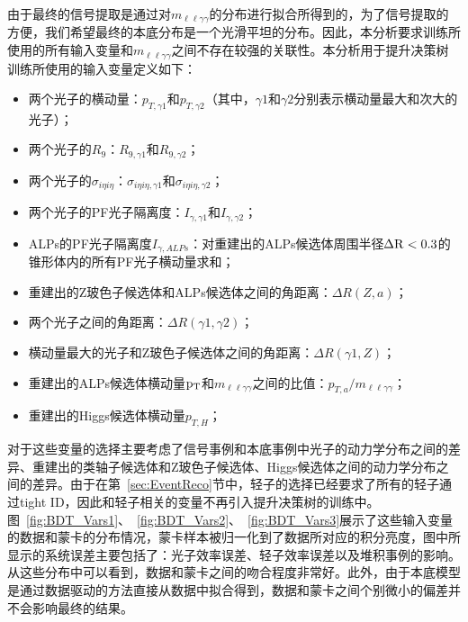 由于最终的信号提取是通过对$m_{\ell\ell\gamma\gamma}$的分布进行拟合所得到的，为了信号提取的方便，我们希望最终的本底分布是一个光滑平坦的分布。因此，本分析要求训练所使用的所有输入变量和$m_{\ell\ell\gamma\gamma}$之间不存在较强的关联性。本分析用于提升决策树训练所使用的输入变量定义如下：
\begin{itemize}
    \item 两个光子的横动量：$p_{T,\gamma1}$和$p_{T,\gamma2}$（其中，$\gamma1$和$\gamma2$分别表示横动量最大和次大的光子）；
    \item 两个光子的$R_9$：$R_{9,\gamma1}$和$R_{9,\gamma2}$；
    \item 两个光子的$\sigma_{i\eta i\eta}$：$\sigma_{i\eta i\eta,\gamma1}$和$\sigma_{i\eta i\eta,\gamma2}$；
    \item 两个光子的PF光子隔离度：$I_{\gamma,\gamma1}$和$I_{\gamma,\gamma2}$；
    \item ALPs的PF光子隔离度$I_{\gamma,ALPs}$：对重建出的ALPs候选体周围半径$\mathrm{\Delta R}<0.3$的锥形体内的所有PF光子横动量求和；
    \item 重建出的Z玻色子候选体和ALPs候选体之间的角距离：$\Delta R(Z,a)$；
    \item 两个光子之间的角距离：$\Delta R(\gamma1,\gamma2)$；
    \item 横动量最大的光子和Z玻色子候选体之间的角距离：$\Delta R (\gamma1,Z)$；
    \item 重建出的ALPs候选体横动量$\mathrm{p_{T}}$和$m_{\ell\ell\gamma\gamma}$之间的比值：$p_{T,a}/m_{\ell\ell\gamma\gamma}$；
    \item 重建出的Higgs候选体横动量$p_{T,H}$；
\end{itemize}
对于这些变量的选择主要考虑了信号事例和本底事例中光子的动力学分布之间的差异、重建出的类轴子候选体和Z玻色子候选体、Higgs候选体之间的动力学分布之间的差异。由于在第~\ref{sec:EventReco}节中，轻子的选择已经要求了所有的轻子通过tight ID，因此和轻子相关的变量不再引入提升决策树的训练中。图~\ref{fig:BDT_Vars1}、~\ref{fig:BDT_Vars2}、~\ref{fig:BDT_Vars3}展示了这些输入变量的数据和蒙卡的分布情况，蒙卡样本被归一化到了数据所对应的积分亮度，图中所显示的系统误差主要包括了：光子效率误差、轻子效率误差以及堆积事例的影响。从这些分布中可以看到，数据和蒙卡之间的吻合程度非常好。此外，由于本底模型是通过数据驱动的方法直接从数据中拟合得到，数据和蒙卡之间个别微小的偏差并不会影响最终的结果。

